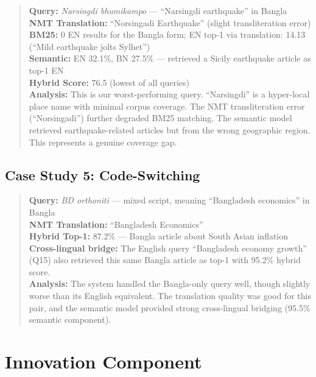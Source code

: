 \documentclass[12pt,a4paper]{article}
\newcommand{\bn}[1]{\textit{#1}}
\begin{document}
\begin{quote}
\textbf{Query:} \bn{Narsingdi bhumikampo} --- ``Narsingdi earthquake'' in Bangla\\
\textbf{NMT Translation:} ``Norsingadi Earthquake'' (slight transliteration error)\\
\textbf{BM25:} 0 EN results for the Bangla form; EN top-1 via translation: 14.13 (``Mild earthquake jolts Sylhet'')\\
\textbf{Semantic:} EN 32.1\%, BN 27.5\% --- retrieved a Sicily earthquake article as top-1 EN\\
\textbf{Hybrid Score:} 76.5 (lowest of all queries)\\
\textbf{Analysis:} This is our worst-performing query. ``Narsingdi'' is a hyper-local place name with minimal corpus coverage. The NMT transliteration error (``Norsingadi'') further degraded BM25 matching. The semantic model retrieved earthquake-related articles but from the wrong geographic region. This represents a genuine coverage gap.
\end{quote}

\subsection{Case Study 5: Code-Switching}

\begin{quote}
\textbf{Query:} \bn{BD orthoniti} --- mixed script, meaning ``Bangladesh economics'' in Bangla\\
\textbf{NMT Translation:} ``Bangladesh Economics''\\
\textbf{Hybrid Top-1:} 87.2\% --- Bangla article about South Asian inflation\\
\textbf{Cross-lingual bridge:} The English query ``Bangladesh economy growth'' (Q15) also retrieved this same Bangla article as top-1 with 95.2\% hybrid score.\\
\textbf{Analysis:} The system handled the Bangla-only query well, though slightly worse than its English equivalent. The translation quality was good for this pair, and the semantic model provided strong cross-lingual bridging (95.5\% semantic component).
\end{quote}


\section{Innovation Component}
\end{document}
